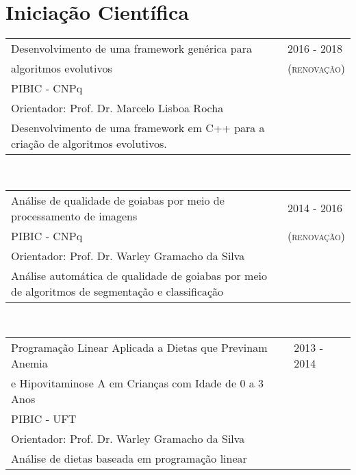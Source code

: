 \section{Iniciação Científica}

\begin{tabular}{p{11cm}|l}
  Desenvolvimento de uma framework genérica para  & \textsc{2016 - 2018} \\
  algoritmos evolutivos & \textsc{(renovação)} \\
  PIBIC - CNPq & \\
  Orientador: Prof. Dr. Marcelo Lisboa Rocha & \\ 
  \footnotesize{Desenvolvimento de uma framework em C++ para a criação de algoritmos evolutivos.} & \\
\end{tabular}\\

\begin{tabular}{p{11cm}|l}
  Análise de qualidade de goiabas por meio de processamento de imagens  & \textsc{2014 - 2016}  \\
  PIBIC - CNPq & \textsc{(renovação)} \\
  Orientador: Prof. Dr. Warley Gramacho da Silva & \\ 
  \footnotesize{Análise automática de qualidade de goiabas por meio de algoritmos de segmentação e classificação} & \\
\end{tabular}\\

\begin{tabular}{p{11cm}|l}
  Programação Linear Aplicada a Dietas que Previnam Anemia  & \textsc{2013 - 2014}  \\
  e Hipovitaminose A em Crianças com Idade de 0 a 3 Anos & \\
  PIBIC - UFT & \\
  Orientador: Prof. Dr. Warley Gramacho da Silva & \\ 
  \footnotesize{Análise de dietas baseada em programação linear} & \\
\end{tabular}\\